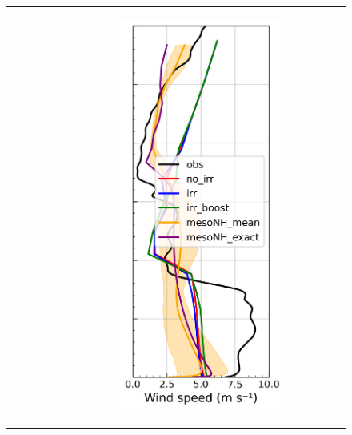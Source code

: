 \begin{figure}[hbtp]
{\begin{tabular}{@{}cccc@{}}
\begin{subfigure}[t]{0.289\textwidth}
        \end{subfigure} &
        \begin{subfigure}[t]{0.283\textwidth}
            \caption{}
            \includegraphics[width=\textwidth]{images/chap5/profiles/profile_elsplans_wind_speed_2007_.png}

\end{subfigure}
\end{tabular}}
\end{figure}
